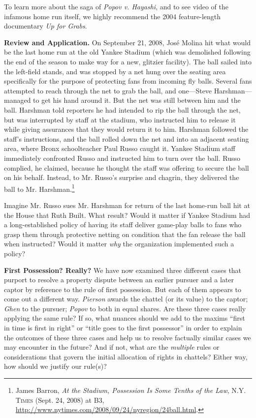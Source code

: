 To learn more about the saga of \textit{Popov v. Hayashi}, and to see video of
the infamous home run itself, we highly recommend the 2004 feature-length
documentary \textit{Up for Grabs}.


\item \textbf{Review and Application.} On September 21, 2008, Jos\'e Molina hit
what would be the last home run at the old Yankee Stadium (which was demolished
following the end of the season to make way for a new, glitzier facility). The
ball sailed into the left-field stands, and was stopped by a net hung over the
seating area specifically for the purpose of protecting fans from incoming fly
balls. Several fans attempted to reach through the net to grab the ball, and
one---Steve Harshman---managed to get his hand around it. But the net was still
between him and the ball. Harshman told reporters he had intended to rip the
ball through the net, but was interrupted by staff at the stadium, who
instructed him to release it while giving assurances that they would return it
to him. Harshman followed the staff's instructions, and the ball rolled down the
net and into an adjacent seating area, where Bronx schoolteacher Paul Russo
caught it. Yankee Stadium staff immediately confronted Russo and instructed him
to turn over the ball. Russo complied, he claimed, because he thought the staff
was offering to secure the ball on his behalf. Instead, to Mr. Russo's surprise
and chagrin, they delivered the ball to Mr. Harshman.\footnote{James Barron,
\textit{At the Stadium, Possession Is Some Tenths of the Law}, \textsc{N.Y.
Times} (Sept. 24, 2008) at B3,
\url{http://www.nytimes.com/2008/09/24/nyregion/24ball.html}.}

Imagine Mr. Russo sues Mr. Harshman for return of the last home-run ball hit at
the House that Ruth Built. What result? Would it matter if Yankee Stadium had a
long-established policy of having its staff deliver game-play balls to fans who
grasp them through protective netting on condition that the fan release the ball
when instructed? Would it matter \textit{why} the organization implemented such
a policy?


\item \textbf{First Possession? Really?} We have now examined three different
cases that purport to resolve a property dispute between an earlier pursuer and
a later captor by reference to the rule of first possession. But each of them
appears to come out a different way. \textit{Pierson} awards the chattel (or its
value) to the captor; \textit{Ghen} to the pursuer; \textit{Popov} to both in
equal shares. Are these three cases really applying the same rule? If so, what
nuances should we add to the maxims ``first in time is first in right'' or
``title goes to the first possessor'' in order to explain the outcomes of these
three cases and help us to resolve factually similar cases we may encounter in
the future? And if not, what are the \textit{multiple} rules or considerations
that govern the initial allocation of rights in chattels? Either way, how should
we justify our rule(s)?

